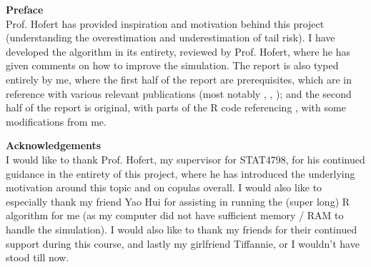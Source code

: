 \documentclass[12pt]{report}
\newcommand{\1}{\mathbf{1}}
\begin{document}
\newpage
\begin{flushleft}
\LARGE
\textbf{Preface} \\
\normalsize
\vspace{1cm}
Prof. Hofert has provided inspiration and motivation behind this project (understanding the overestimation and underestimation of tail risk). I have developed the algorithm in its entirety, reviewed by Prof. Hofert, where he has given comments on how to improve the simulation. The report is also typed entirely by me, where the first half of the report are prerequisites, which are in reference with various relevant publications (most notably \cite{HofertBook}, \cite{KojadinovicYi2024Smooth}, \cite{SegersEBC}); and the second half of the report is original, with parts of the R code referencing \cite{copulaRPackage2023}, \cite{KojadinovicYi2024Smooth} with some modifications from me. 
\end{flushleft}

\newpage
\begin{flushleft}
\LARGE
\textbf{Acknowledgements} \\
\normalsize
\vspace{1cm}
I would like to thank Prof. Hofert, my supervisor for STAT4798, for his continued guidance in the entirety of this project, where he has introduced the underlying motivation around this topic and on copulas overall. I would also like to especially thank my friend Yao Hui for assisting in running the (super long) R algorithm for me (as my computer did not have sufficient memory / RAM to handle the simulation). I would also like to thank my friends for their continued support during this course, and lastly my girlfriend Tiffannie, or I wouldn't have stood till now.
\end{flushleft}

\tableofcontents
\renewcommand\thesection{\arabic{section}}
\end{document}
